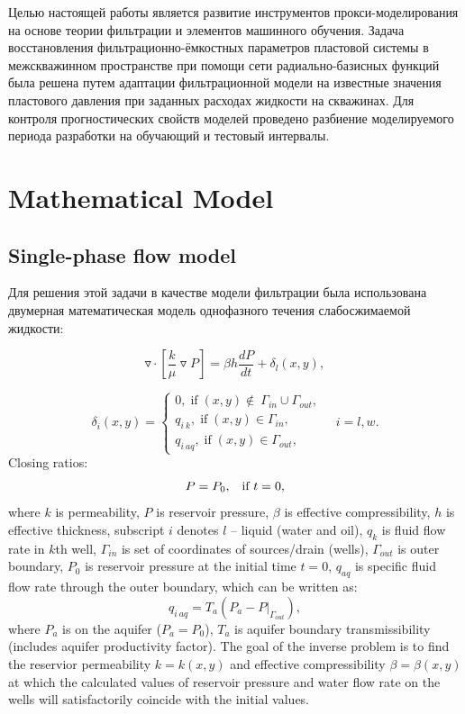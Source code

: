 \documentclass{article}
\begin{document}
Целью настоящей работы является развитие инструментов прокси-моделирования на основе теории фильтрации и элементов машинного обучения. Задача восстановления фильтрационно-ёмкостных параметров пластовой системы в межскважинном пространстве при помощи сети радиально-базисных функций была решена путем адаптации фильтрационной модели на известные значения пластового давления при заданных расходах жидкости на скважинах. Для контроля прогностических свойств моделей проведено разбиение моделируемого периода разработки на обучающий и тестовый интервалы.

\section{Mathematical Model}

\subsection{Single-phase flow model}
Для решения этой задачи в качестве модели фильтрации была использована двумерная математическая модель однофазного течения
слабосжимаемой жидкости:

\begin{equation} \label{fil}
	\triangledown \cdot \left[\frac{k}{\mu}\triangledown P \right] = \beta h\frac{dP}{dt} + \delta_{l}(x,y),
\end{equation}

\begin{equation} \label{bc}
	\delta_{i}(x,y)  = \left\{\begin{array}{crl}
		0, \;\mbox{if}\;(x,y) \notin\ \Gamma_{in}\cup\Gamma_{out},\\
		q_{i\:k}, \;\mbox{if}\;(x,y) \in \Gamma_{in},\\
		q_{i\:aq}, \;\mbox{if}\;(x,y) \in \Gamma_{out},
	\end{array}\right. \quad i = l,w.
\end{equation}
Closing ratios:
\begin{equation} \label{kr}
P = P_0\mbox{,\quad \mbox{if} $t=0$},
\end{equation}
where $k$ is permeability, $P$ is reservoir pressure, $\beta$ is
effective compressibility, $h$ is effective thickness, subscript $i$ denotes $l$ -- liquid
(water and oil), $q_k$ is fluid flow rate in $k$th well, $\Gamma_{in}$
is set of coordinates of sources/drain (wells), $\Gamma_{out}$ is
outer boundary, $P_0$ is reservoir pressure at the initial time $t=0$, $q_{aq}$ is specific fluid flow rate through the outer boundary, which can be written as:
\begin{equation*} \label{qaq}
	q_{i\:aq} = T_a(P_{a} - P|_{\Gamma_{out}}),
\end{equation*}
where $P_a$ is on the aquifer ($P_a = P_0$), $T_a$ is
aquifer boundary transmissibility (includes aquifer productivity factor). The goal of the inverse problem is to find the reservior permeability $k = k(x,y)$ and effective compressibility $\beta = \beta(x,y)$ at which the calculated values of reservoir pressure and water flow rate on the wells will satisfactorily coincide with the initial values.
\end{document}
